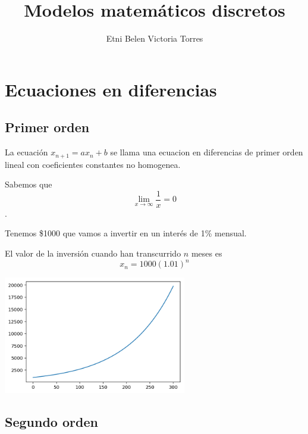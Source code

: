 \documentclass{article}
\title{Modelos matemáticos discretos}
\author{Etni Belen Victoria Torres}
\begin{document}
\maketitle
\section{Ecuaciones en diferencias}
\subsection{Primer orden}

La ecuación $x_{n+1}=ax_n+b$ se llama una ecuacion en diferencias de primer orden lineal con coeficientes constantes no homogenea.  

Sabemos que $$\lim_{x\to\infty}\frac{1}{x}=0$$.

Tenemos \$1000 que vamos a invertir en un interés de 1\% mensual. 

El valor de la inversión cuando han transcurrido $n$ meses es $$x_n=1000(1.01)^n$$

\begin{center}
\includegraphics[width=8cm]{grafica}
\end{center}

\subsection{Segundo orden} 
\end{document}
